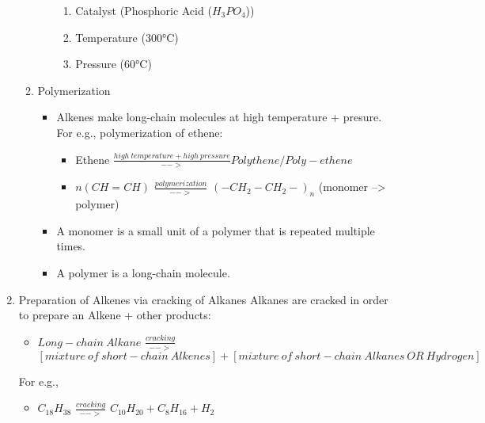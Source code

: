 \documentclass[11pt]{article}
\begin{document}
\begin{enumerate}
\begin{enumerate}
\begin{itemize}
\begin{enumerate}
\item Catalyst (Phosphoric Acid (\(H_3PO_4\)))
\item Temperature (300°C)
\item Pressure (60°C)
\end{enumerate}
\end{itemize}
\item Polymerization
\begin{itemize}
\item Alkenes make long-chain molecules at high temperature + presure. For e.g., polymerization of ethene:
\begin{itemize}
\item Ethene \(\frac{high\ temperature + high\ pressure}{-->} Polythene/Poly-ethene\)
\item \(n(CH=CH)\) \(\frac{polymerization}{-->}\) \((-CH_2-CH_2-)_n\) (monomer --> polymer)
\end{itemize}
\item A monomer is a small unit of a polymer that is repeated multiple times.
\item A polymer is a long-chain molecule.
\end{itemize}
\end{enumerate}
\item Preparation of Alkenes via cracking of Alkanes
\label{sec:org0c9a8a1}
Alkanes are cracked in order to prepare an Alkene + other products:
\begin{itemize}
\item \(Long-chain\ Alkane\) \(\frac{cracking}{-->}\) \([mixture\ of\ short-chain\ Alkenes] + [mixture\ of\ short-chain\ Alkanes\ OR\ Hydrogen]\)
\end{itemize}
For e.g.,
\begin{itemize}
\item \(C_{18}H_{38}\) \(\frac{cracking}{-->}\) \(C_{10}H_{20} + C_8H_{16} + H_2\)
\end{itemize}
\end{enumerate}
\end{document}
